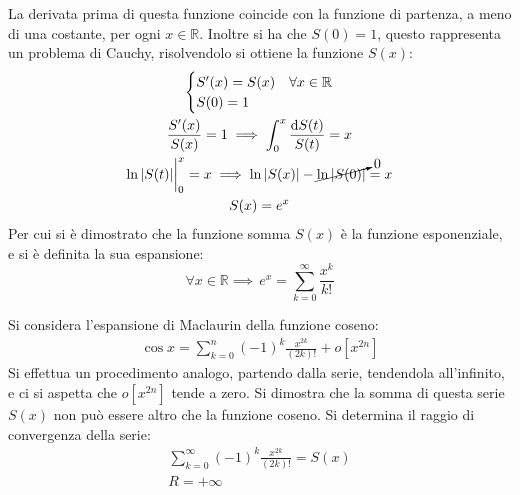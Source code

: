 \documentclass{article}
\newcommand{\df}{\mathrm{d}}
\numberwithin{equation}{subsection}
\begin{document}
La derivata prima di questa funzione coincide con la funzione di partenza, a meno di una costante, per ogni $x\in\mathbb{R}$. Inoltre si ha che $S(0)=1$, questo rappresenta un problema di Cauchy, risolvendolo si ottiene la funzione $S(x)$:
\begin{gather*}
    \begin{cases}
        S'(x)=S(x)&\forall x\in\mathbb{R}\\
        S(0)=1
    \end{cases}\\
    \displaystyle\frac{S'(x)}{S(x)}=1\implies\int_0^x\frac{\df S(t)}{S(t)}=x\\
    \ln|S(t)|\bigg|_0^x=x\implies \ln|S(x)|-\cancelto{0}{\ln|S(0)|}=x\\
    S(x)=e^x
\end{gather*}
Per cui si è dimostrato che la funzione somma $S(x)$ è la funzione esponenziale, e si è definita la sua espansione:
\begin{equation}
    \forall x\in\mathbb{R}\implies\,e^x=\displaystyle\sum_{k=0}^\infty\frac{x^k}{k!}
\end{equation}

Si considera l'espansione di Maclaurin della funzione coseno:
\begin{gather*}
    \cos x=\displaystyle\sum_{k=0}^n(-1)^k\frac{x^{2k}}{(2k)!}+o[x^{2n}]
\end{gather*}
Si effettua un procedimento analogo, partendo dalla serie, tendendola all'infinito, e ci si aspetta che $o[x^{2n}]$ tende a zero. Si dimostra che la somma di questa serie $S(x)$ non può essere altro che la funzione coseno. 
Si determina il raggio di convergenza della serie:
\begin{gather*}
    \displaystyle\sum_{k=0}^\infty(-1)^k\frac{x^{2k}}{(2k)!}=S(x)\\
    R=+\infty
\end{gather*}
\end{document}
